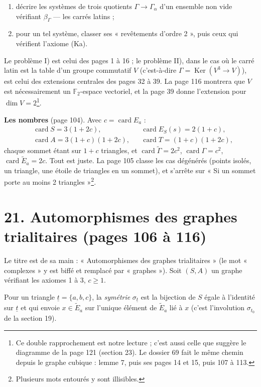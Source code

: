 \documentclass[11pt,a4paper]{article}
\begin{document}
\begin{enumerate}
\item[I)] décrire les systèmes de trois quotients $\Gamma \to \Gamma_\alpha$
  d'un ensemble non vide vérifiant $\beta_\Gamma$ --- les carrés latins ;
\item[II)] pour un tel système, classer ses « revêtements d'ordre 2 », puis
  ceux qui vérifient l'axiome (Ka).
\end{enumerate}

Le problème I) est celui des pages 1 à 16 ; le problème II), dans le cas où le
carré latin est la table d'un groupe commutatif $V$ (c'est-à-dire $\Gamma =
\operatorname{Ker}(V^3 \to V)$), est celui des extensions centrales des pages 32
à 39. La page 116 montrera que $V$ est nécessairement un
$\mathbb{F}_2$-espace vectoriel, et la page 39 donne l'extension pour $\dim V =
2$\footnote{Ce double rapprochement est notre lecture ; c'est aussi celle que
suggère le diagramme de la page 121 (section 23). Le dossier 69 fait le même
chemin depuis le graphe cubique : lemme 7, puis ses pages 14 et 15, puis
107 à 113.}.

\textbf{Les nombres} (page 104). Avec $c = \operatorname{card} E_a$ :
\[
\begin{aligned}
&\operatorname{card} S = 3(1 + 2c), && \operatorname{card} E_S(s) = 2(1 + c), \\
&\operatorname{card} A = 3(1+c)(1+2c), && \operatorname{card} T = (1+c)(1+2c),
\end{aligned}
\]
chaque sommet étant sur $1 + c$ triangles, et $\operatorname{card}\widetilde
\Gamma = 2c^2$, $\operatorname{card}\Gamma = c^2$, $\operatorname{card}\widetilde
E_a = 2c$. Tout est juste. La page 105 classe les cas dégénérés (points isolés,
un triangle, une étoile de triangles en un sommet), et s'arrête sur « Si un
sommet porte au moins 2 triangles »\footnote{Plusieurs mots entourés y sont
illisibles.}.

\section*{21. Automorphismes des graphes trialitaires (pages 106 à 116)}

Le titre est de sa main : « Automorphismes des graphes trialitaires » (le mot
« complexes » y est biffé et remplacé par « graphes »). Soit $(S, A)$ un graphe
vérifiant les axiomes 1 à 3, $c \geq 1$.

Pour un triangle $\underline t = \lbrace a, b, c\rbrace$, la \emph{symétrie}
$\sigma_{\underline t}$ est la bijection de $S$ égale à l'identité sur
$\underline t$ et qui envoie $x \in \widetilde E_a$ sur l'unique élément de
$\widetilde E_a$ lié à $x$ (c'est l'involution $\sigma_{t_0}$ de la section
19).
\end{document}
